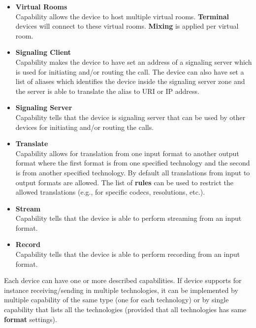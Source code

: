 \begin{itemize}
\item \textbf{Virtual Rooms}  \\
  Capability allows the device to host multiple virtual 
  rooms. \textbf{Terminal} devices will connect to these virtual rooms. 
  \textbf{Mixing} is applied per virtual room.

\item \textbf{Signaling Client} \\
  Capability makes the device to have set an address of a signaling server 
  which is used for initiating and/or routing the call. The device can
  also have set a list of aliases which identifies the device inside
  the signaling server zone and the server is able to translate the alias
  to URI or IP address.

\item \textbf{Signaling Server} \\
  Capability tells that the device is signaling server that can be used
  by other devices for initiating and/or routing the calls.

\item \textbf{Translate}  \\
  Capability allows for translation from one input format to another output 
  format where the first format is from one specified technology and the 
  second is from another specified technology. By default all translations 
  from input to output formats are allowed. The list of \textbf{rules} can be 
  used to restrict the allowed translations (e.g., for specific codecs, 
  resolutions, etc.).

\item \textbf{Stream}  \\
  Capability tells that the device is able to perform streaming from an input 
  format.

\item \textbf{Record}  \\
  Capability tells that the device is able to perform recording from an input 
  format.
\end{itemize}

Each device can have one or more described capabilities. If device supports 
for instance receiving/sending in multiple technologies, it can be implemented 
by multiple capability of the same type (one for each technology) or by single 
capability that lists all the technologies (provided that all technologies has 
same \textbf{format} settings).

